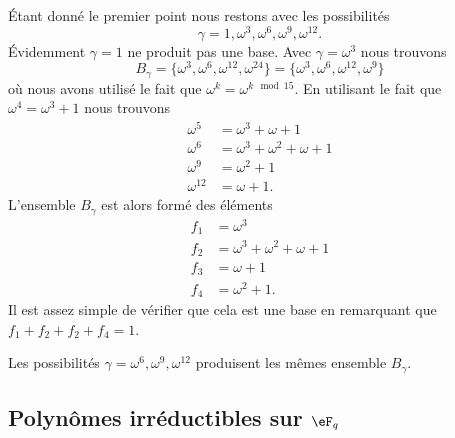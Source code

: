 \begin{example}
\begin{enumerate}
            Étant donné le premier point nous restons avec les possibilités
            \begin{equation}
                \gamma=1,\omega^3,\omega^6,\omega^9,\omega^{12}.
            \end{equation}
            Évidemment \( \gamma=1\) ne produit pas une base. Avec \( \gamma=\omega^3\) nous trouvons
            \begin{equation}
                B_{\gamma}=\{ \omega^3,\omega^6,\omega^{12},\omega^{24} \}=\{ \omega^3,\omega^6,\omega^{12},\omega^9 \}
            \end{equation}
            où nous avons utilisé le fait que \( \omega^k=\omega^{k\mod 15}\). En utilisant le fait que \( \omega^4=\omega^3+1\) nous trouvons
            \begin{subequations}
                \begin{align}
                    \omega^5&=\omega^3+\omega+1\\
                    \omega^6&=\omega^3+\omega^2+\omega+1\\
                    \omega^9&=\omega^2+1\\
                    \omega^{12}&=\omega+1.
                \end{align}
            \end{subequations}
            L'ensemble \( B_{\gamma}\) est alors formé des éléments
            \begin{subequations}
                \begin{align}
                    f_1&=\omega^3\\
                    f_2&=\omega^3+\omega^2+\omega+1\\
                    f_3&=\omega+1\\
                    f_4&=\omega^2+1.
                \end{align}
            \end{subequations}
            Il est assez simple de vérifier que cela est une base en remarquant que \( f_1+f_2+f_2+f_4=1\).

            Les possibilités \( \gamma=\omega^6,\omega^9,\omega^{12}\) produisent les mêmes ensemble \( B_{\gamma}\).
    \end{enumerate}
\end{example}

\subsection{Polynômes irréductibles sur $\eF_q$}

